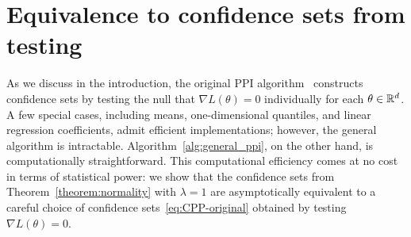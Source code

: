 \section{Equivalence to confidence sets from testing}
\label{sec:equivalence}

As we discuss in the introduction, the original PPI
algorithm~\cite{AngelopoulosBaFaJoZr23} constructs confidence sets by testing the null that $\nabla L(\theta) = 0$ individually for each $\theta \in \mathbb{R}^d$.
%
A few special cases, including means, one-dimensional quantiles, and linear
regression coefficients, admit efficient implementations; however, the
general algorithm is intractable. Algorithm~\ref{alg:general_ppi}, on the
other hand, is computationally straightforward.
%
This computational efficiency comes at no cost in terms of statistical
power: we show that the confidence sets from Theorem~\ref{theorem:normality}
with $\lambda = 1$ are asymptotically equivalent to a careful choice of
confidence sets~\eqref{eq:CPP-original} obtained by testing $\nabla
L(\theta) = 0$.


